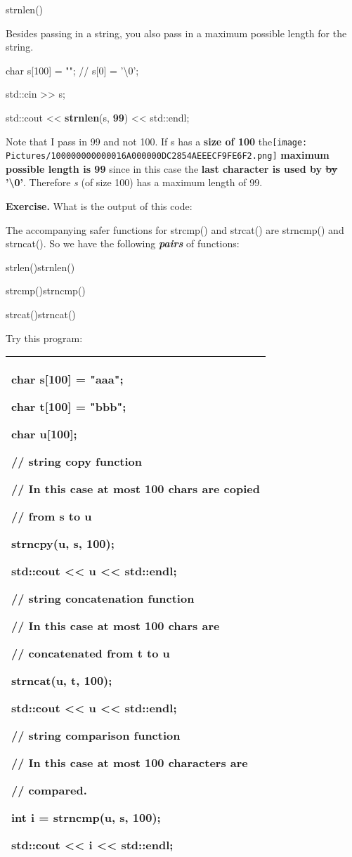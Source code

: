\documentclass[
]{article}
\begin{document}
strnlen()

Besides passing in a string, you also pass in a maximum possible length
for the string.

char s{[}100{]} = ""; // s{[}0{]} = '\textbackslash0';

std::cin \textgreater\textgreater{} s;

std::cout \textless\textless{} \textbf{strnlen}(s, \textbf{99})
\textless\textless{} std::endl;

Note that I pass in 99 and not 100. If s has a \textbf{size of 100}
the\texttt{[image: Pictures/100000000000016A000000DC2854AEEECF9FE6F2.png]}
\textbf{maximum possible length is 99} since in this case the
\textbf{last character is used by \sout{by} '\textbackslash0'}.
Therefore \emph{s} (of size 100) has a maximum length of 99.

\textbf{Exercise.} What is the output of this code:

The accompanying safer functions for strcmp() and strcat() are strncmp()
and strncat(). So we have the following \emph{\textbf{pairs}} of
functions:

strlen()strnlen()

strcmp()strncmp()

strcat()strncat()

Try this program:

\begin{longtable}[]{@{}l@{}}
\toprule
\endhead
\begin{minipage}[t]{0.97\columnwidth}\raggedright
char s{[}100{]} = "aaa";

char t{[}100{]} = "bbb";

char u{[}100{]};

// string copy function

// In this case at most 100 chars are copied

// from s to u

strncpy(u, s, 100);

std::cout \textless\textless{} u \textless\textless{} std::endl;

// string concatenation function

// In this case at most 100 chars are

// concatenated from t to u

strncat(u, t, 100);

std::cout \textless\textless{} u \textless\textless{} std::endl;

// string comparison function

// In this case at most 100 characters are

// compared.

int i = strncmp(u, s, 100);

std::cout \textless\textless{} i \textless\textless{} std::endl;\strut
\end{minipage}\tabularnewline
\bottomrule
\end{longtable}
\end{document}
